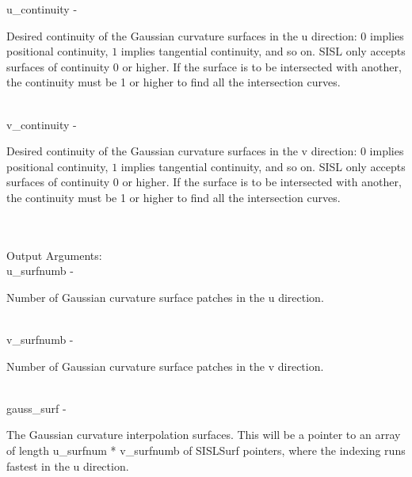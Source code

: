         \>\>    {\fov u\_continuity}\> - \>  \begin{minipg2}
                     Desired continuity of the Gaussian curvature surfaces
                          in the u direction: $0$ implies positional continuity,
                          $1$ implies tangential continuity, and so on.
                          SISL only accepts surfaces of continuity 0 or higher.
                          If the surface is to be intersected with another,
                          the continuity must be 1 or higher to find all the
                          intersection curves.
                               \end{minipg2}\\[0.8ex]
        \>\>    {\fov v\_continuity}\> - \>  \begin{minipg2}
                     Desired continuity of the Gaussian curvature surfaces
                          in the v direction: $0$ implies positional continuity,
                          $1$ implies tangential continuity, and so on.
                          SISL only accepts surfaces of continuity 0 or higher.
                          If the surface is to be intersected with another,
                          the continuity must be 1 or higher to find all the
                          intersection curves.
                               \end{minipg2}\\[0.8ex]
\\
	\>Output Arguments:\\
        \>\>    {\fov u\_surfnumb}\> - \>  \begin{minipg2}
                     Number of Gaussian curvature surface patches
                          in the u direction.
                               \end{minipg2}\\[0.8ex]
        \>\>    {\fov v\_surfnumb}\> - \>  \begin{minipg2}
                     Number of Gaussian curvature surface patches
                          in the v direction.
                               \end{minipg2}\\[0.8ex]
        \>\>    {\fov gauss\_surf}\> - \>  \begin{minipg2}
                     The Gaussian curvature interpolation surfaces.
                          This will be a pointer to an array of length
                          {\fov u\_surfnum} * {\fov v\_surfnumb} of
                          SISLSurf pointers, where the indexing runs
                          fastest in the u direction.
                               \end{minipg2}\\[0.8ex]
